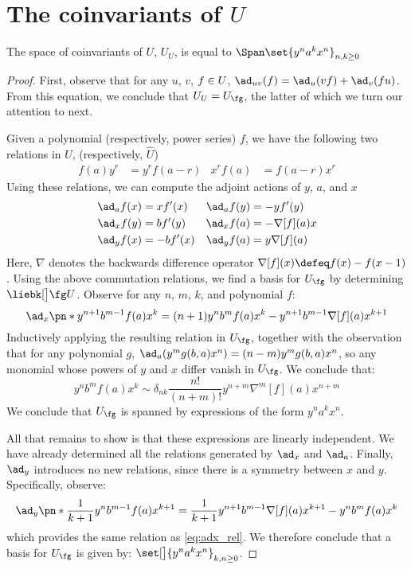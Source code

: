 \documentclass{article}
\begin{document}
\section{The coinvariants of $U$}

\begin{theorem}
        The space of coinvariants of $U$, $U_U$, is equal to
        $\Span\set{y^n a^k x^n}_{n, k\ge 0}$
\end{theorem}
\begin{proof}
First, observe that for any $u$, $v$, $f\in U$,
$\ad_{uv}(f) = \ad_u(vf) + \ad_v(fu)$. From this equation, we conclude that
$\CU_\CU = \CU_\Alg$, the latter of which we turn our attention to next.

Given a polynomial (respectively, power series) $f$, we have the following two
relations in $U$, (respectively, $\widehat U$)
\begin{align}
        f(a)y^r &= y^rf(a-r) &
        x^rf(a) &= f(a-r)x^r
\end{align}
Using these relations, we can compute the adjoint actions of $y$, $a$, and $x$
\begin{align}
  \ad_a f(x) &= xf'(x)&
  \ad_a f(y) &= -yf'(y)\label{eq:ada}\\
  \ad_x f(y) &= bf'(y) &
  \ad_x f(a) &= -\nabla[f](a)x\label{eq:adx}\\
  \ad_y f(x) &= -bf'(x) &
  \ad_y f(a) &= y\nabla[f](a)\label{eq:ady}
\end{align}
Here, $\nabla$ denotes the backwards difference operator $\nabla[f](x) \defeq
f(x) - f(x-1)$. Using the above commutation relations, we find a basis for
$U_{\fg}$ by determining $\liebk[\big] \fg U$. Observe for any $n$, $m$, $k$,
and polynomial $f$:
\begin{equation}\label{eq:adx_rel}
\ad_{x}\pn*{y^{n+1}b^{m-1}f(a)x^{k}} =
(n+1)y^{n}b^{m}f(a)x^{k} - y^{n+1}b^{m-1}\nabla[f](a)x^{k+1}
\end{equation}
Inductively applying the resulting relation in $U_{\fg}$, together with the
observation that for any polynomial $g$,
$\ad_a (y^m g(b, a) x^n ) = (n-m)y^mg(b, a) x^n$,
so any monomial whose powers of $y$ and $x$ differ vanish in $\CU_{\Alg}$. We
conclude that:
\begin{equation}
        y^n b^m f(a) x^k \sim δ_{nk}\frac{n!}{(n+m)!}y^{n+m}\nabla^m[f](a)x^{n+m}
\end{equation}
We conclude that $\CU_{\Alg}$ is spanned by expressions of the form
$y^n a^k x^n$.

All that remains to show is that these expressions are linearly independent. We
have already determined all the relations generated by $\ad_x$ and $\ad_a$.
Finally, $\ad_y$ introduces no new relations, since there is a symmetry between
$x$ and $y$. Specifically, observe:
\begin{equation}
        \ad_y\pn*{
                \frac1{k+1}y^n b^{m-1} f(a) x^{k+1}
        }
        =\frac1{k+1} y^{n+1} b^{m-1} \nabla[f](a)x^{k+1} - y^n b^m f(a) x^k
\end{equation}
which provides the same relation as \cref{eq:adx_rel}. We therefore conclude
that a basis for $\CU_{\Alg}$ is given by:
$\set[\big]{y^n a^k x^n}_{k, n \ge 0}$.
\end{proof}
\end{document}
